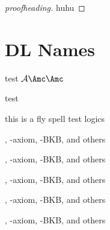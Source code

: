 \begin{proof}[proofheading]
  huhu 
\end{proof}

\section{DL Names}
\label{sec:dl-names}

\ALCALC \SHOIQSHOIQ \ALC \ALC

{\Huge \textbf{\ALCALC} test $\mathcal{A} \Amc \mathbf{\Amc}$ \textbf{\A}

\textbf{\SHOIQSHOIQ}}

test

this is a fly spell test logics 

\ALC, \ALC-axiom, \ALC-BKB, \ALC and others

\SHOIQ, \SHOIQ-axiom, \SHOIQ-BKB, \SHOIQ and others

\ALCALC, \ALCALC-axiom, \ALCALC-BKB, \ALCALC and others

\LMLO, \LMLO-axiom, \LMLO-BKB, \LMLO and others

\condl{\LM}{\EL}, \condl{\EL}{\LO}-axiom, \condl{\EL}{\SHOIQ}-BKB, \condl{\SHQ}{\ALC} and others

\textbf{\ALC}


